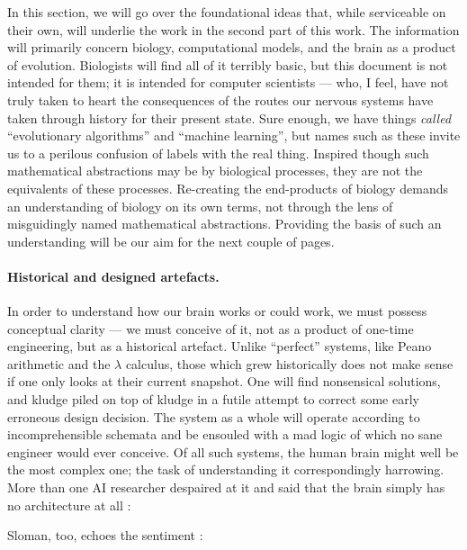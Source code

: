 In this section, we will go over the foundational ideas that, while serviceable on their own, will underlie the work in the second part of this work. The information will primarily concern biology, computational models, and the brain as a product of evolution. Biologists will find all of it terribly basic, but this document is not intended for them; it is intended for computer scientists --- who, I feel, have not truly taken to heart the consequences of the routes our nervous systems have taken through history for their present state. Sure enough, we have things {\em called} ``evolutionary algorithms'' and ``machine learning'', but names such as these invite us to a perilous confusion of labels with the real thing. Inspired though such mathematical abstractions may be by biological processes, they are not the equivalents of these processes. Re-creating the end-products of biology demands an understanding of biology on its own terms, not through the lens of misguidingly named mathematical abstractions. Providing the basis of such an understanding will be our aim for the next couple of pages.

\paragraph{Historical and designed artefacts.} In order to understand how our brain works or could work, we must possess conceptual clarity --- we must conceive of it, not as a product of one-time engineering, but as a historical artefact. Unlike ``perfect'' systems, like Peano arithmetic and the $\lambda$ calculus, those which grew historically does not make sense if one only looks at their current snapshot. One will find nonsensical solutions, and kludge piled on top of kludge in a futile attempt to correct some early erroneous design decision. The system as a whole will operate according to incomprehensible schemata and be ensouled with a mad logic of which no sane engineer would ever conceive. Of all such systems, the human brain might well be the most complex one; the task of understanding it correspondingly harrowing. More than one AI researcher despaired at it and said that the brain simply has no architecture at all \cite[p. ]{norvig}:

\begin{quotation}
\end{quotation}

Sloman, too, echoes the sentiment \cite[p. 5]{sloman1997}:

